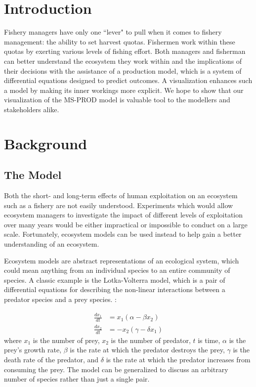 \documentclass{article}
\begin{document}
\section{Introduction}

Fishery managers have only one ``lever" to pull when it comes to fishery management: the ability to set harvest quotas.  Fishermen work within these quotas by exerting various levels of fishing effort.  Both managers and fisherman can better understand the ecosystem they work within and the implications of their decisions with the assistance of a production model, which is a system of differential equations designed to predict outcomes.  A visualization enhances such a model by making its inner workings more explicit. We hope to show that our visualization of the MS-PROD model is valuable tool to the modellers and stakeholders alike. 

\section{Background}

\subsection{The Model}

Both the short- and long-term effects of human exploitation on an ecosystem such as a fishery are not easily understood.  Experiments which would allow ecosystem managers to investigate the impact of different levels of exploitation over many years would be either impractical or impossible to conduct on a large scale.  Fortunately, ecosystem models can be used instead to help gain a better understanding of an ecosystem.

Ecosystem models are abstract representations of an ecological system, which could mean anything from an individual species to an entire community of species.  A classic example is the Lotka-Volterra model, which is a pair of differential equations for describing the non-linear interactions between a predator species and a prey species. \cite{Lotka1926fds, VOL26a}:

\begin{align}
   \frac{d x_1}{dt} &=   x_1 \left(\alpha - \beta  x_2\right) 
\\ \frac{d x_2}{dt} &= - x_2 \left(\gamma - \delta x_1\right)
\end{align}
where $x_1$ is the number of prey, $x_2$ is the number of predator, $t$ is time, $\alpha$ is the prey's growth rate, $\beta$ is the rate at which the predator destroys the prey, $\gamma$ is the death rate of the predator, and $\delta$ is the rate at which the predator increases from consuming the prey.  The model can be generalized to discuss an arbitrary number of species rather than just a single pair.
\end{document}
